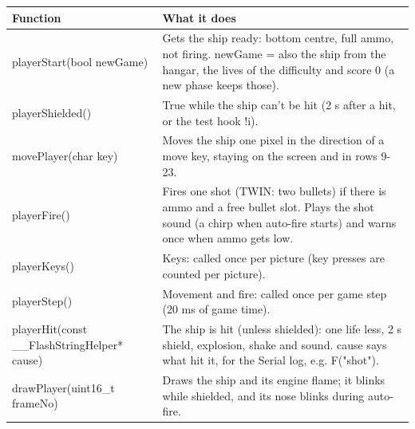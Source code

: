 \documentclass[11pt,a4paper]{article}
\begin{document}
\par\noindent\begin{minipage}{\linewidth}\centering\footnotesize
\begin{tabular}{|>{\raggedright\arraybackslash}p{5.82cm}|>{\raggedright\arraybackslash}p{10.68cm}|}
\hline\rowcolor{accent}\textbf{\color{white}Function} & \textbf{\color{white}What it does}\\\hline
playerStart(bool newGame) & Gets the ship ready: bottom centre, full ammo, not firing. newGame = also the ship from the hangar, the lives of the difficulty and score 0 (a new phase keeps those).\\\hline
\rowcolor{rowshade}playerShielded() & True while the ship can't be hit (2 s after a hit, or the test hook !i).\\\hline
movePlayer(char key) & Moves the ship one pixel in the direction of a move key, staying on the screen and in rows 9-23.\\\hline
\rowcolor{rowshade}playerFire() & Fires one shot (TWIN: two bullets) if there is ammo and a free bullet slot. Plays the shot sound (a chirp when auto-fire starts) and warns once when ammo gets low.\\\hline
playerKeys() & Keys: called once per picture (key presses are counted per picture).\\\hline
\rowcolor{rowshade}playerStep() & Movement and fire: called once per game step (20 ms of game time).\\\hline
playerHit(const \_\_FlashStringHelper* cause) & The ship is hit (unless shielded): one life less, 2 s shield, explosion, shake and sound. cause says what hit it, for the Serial log, e.g. F("shot").\\\hline
\rowcolor{rowshade}drawPlayer(uint16\_t frameNo) & Draws the ship and its engine flame; it blinks while shielded, and its nose blinks during auto-fire.\\\hline
\end{tabular}
\end{minipage}\par\medskip
\end{document}
